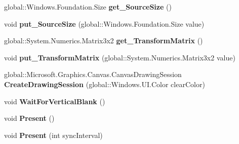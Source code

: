 \begin{DoxyCompactItemize}
global\+::\+Windows.\+Foundation.\+Size {\bfseries get\+\_\+\+Source\+Size} ()
\item 
\mbox{\label{interface_microsoft_1_1_graphics_1_1_canvas_1_1_i_canvas_swap_chain_a2d4805496ff1ec4619b1157a60720971}} 
void {\bfseries put\+\_\+\+Source\+Size} (global\+::\+Windows.\+Foundation.\+Size value)
\item 
\mbox{\label{interface_microsoft_1_1_graphics_1_1_canvas_1_1_i_canvas_swap_chain_ad0ee43ededec68f0e33cd0f0ce1cbb35}} 
global\+::\+System.\+Numerics.\+Matrix3x2 {\bfseries get\+\_\+\+Transform\+Matrix} ()
\item 
\mbox{\label{interface_microsoft_1_1_graphics_1_1_canvas_1_1_i_canvas_swap_chain_a28c5d9ed4784f66f247e9176d9ab4e33}} 
void {\bfseries put\+\_\+\+Transform\+Matrix} (global\+::\+System.\+Numerics.\+Matrix3x2 value)
\item 
\mbox{\label{interface_microsoft_1_1_graphics_1_1_canvas_1_1_i_canvas_swap_chain_ad982604c4c691d7ca1af93bcd60455f2}} 
global\+::\+Microsoft.\+Graphics.\+Canvas.\+Canvas\+Drawing\+Session {\bfseries Create\+Drawing\+Session} (global\+::\+Windows.\+U\+I.\+Color clear\+Color)
\item 
\mbox{\label{interface_microsoft_1_1_graphics_1_1_canvas_1_1_i_canvas_swap_chain_a31ac623b91f0f24a54eaa1f47475c056}} 
void {\bfseries Wait\+For\+Vertical\+Blank} ()
\item 
\mbox{\label{interface_microsoft_1_1_graphics_1_1_canvas_1_1_i_canvas_swap_chain_a6489739742b77ba79f394f7b1311ac1b}} 
void {\bfseries Present} ()
\item 
\mbox{\label{interface_microsoft_1_1_graphics_1_1_canvas_1_1_i_canvas_swap_chain_a5f5e56503e7a70b7906c91353fd467ab}} 
void {\bfseries Present} (int sync\+Interval)
\item 

\end{DoxyCompactItemize}

